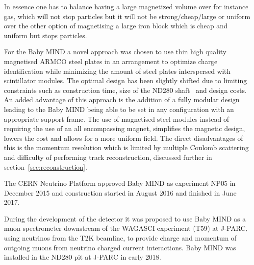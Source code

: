 In essence one has to balance having a large magnetized volume over for instance gas, which will not stop particles but it will not be strong/cheap/large or uniform over the other option of magnetising a large iron block which is cheap and uniform but stops particles.

For the Baby MIND a novel approach was chosen to use thin high quality magnetised ARMCO steel plates in an arrangement to optimize charge identification while minimizing the amount of steel plates interspersed with scintillator modules. The optimal design has been slightly shifted due to limiting constraints such as construction time, size of the ND280 shaft~\cite{21T2K} and design costs. An added advantage of this approach is the addition of a fully modular design leading to the Baby MIND being able to be set in any configuration with an appropriate support frame. The use of magnetised steel modules instead of requiring the use of an all encompassing magnet, simplifies the magnetic design, lowers the cost and allows for a more uniform field. The direct disadvantages of this is the momentum resolution which is limited by multiple Coulomb scattering and difficulty of performing track reconstruction, discussed further in section~\ref{sec:reconstruction}.

The CERN Neutrino Platform approved Baby MIND as experiment NP05 in December 2015 and construction started in August 2016 and finished in June 2017. 

During the development of the detector it was proposed to use Baby MIND as a muon spectrometer downstream of the WAGASCI experiment (T59) at J-PARC, using neutrinos from the T2K beamline, to provide charge and momentum of outgoing muons from neutrino charged current interactions. Baby MIND was installed in the ND280 pit at J-PARC in early 2018.





